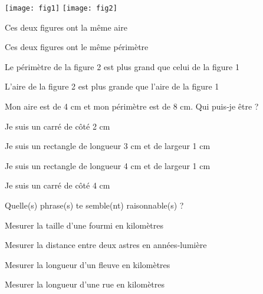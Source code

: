 


\begin{QCM}
  \begin{GroupeQCM}
    \begin{exercice}
    
\begin{center}      \texttt{[image: fig1]} \texttt{[image: fig2]}  \end{center}
      \begin{ChoixQCM}{4}
      \item Ces deux figures ont la même aire
      \item Ces deux figures ont le même périmètre
      \item Le périmètre de la figure 2 est plus grand que celui de la figure 1
      \item L'aire de la figure  2 est plus grande que l'aire de la figure 1
      \end{ChoixQCM}
\begin{corrige}
   \end{corrige}
    \end{exercice}


    \begin{exercice}
      Mon aire est de 4 cm et mon périmètre est de 8 cm. Qui puis‑je être ?
      \begin{ChoixQCM}{4}
      \item Je suis un carré de côté 2 cm
      \item Je suis un rectangle de longueur 3 cm et de largeur 1 cm
      \item Je suis un rectangle de longueur 4 cm et de largeur 1 cm
      \item Je suis un carré de côté 4 cm
      \end{ChoixQCM}
\begin{corrige}
   \end{corrige}
    \end{exercice}
    
    
    \begin{exercice}
      Quelle(s) phrase(s) te semble(nt) raisonnable(s) ?
      \begin{ChoixQCM}{4}
      \item Mesurer la taille d'une fourmi en kilomètres
      \item Mesurer la distance entre deux astres en années‑lumière
      \item Mesurer la longueur d'un fleuve en kilomètres
      \item Mesurer la longueur d'une rue en kilomètres
      \end{ChoixQCM}
\begin{corrige}
   \end{corrige}
    \end{exercice}



\end{GroupeQCM}
\end{QCM}
